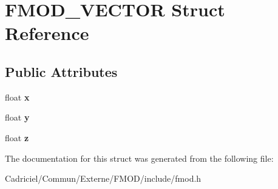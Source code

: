 \hypertarget{struct_f_m_o_d___v_e_c_t_o_r}{\section{F\-M\-O\-D\-\_\-\-V\-E\-C\-T\-O\-R Struct Reference}
\label{struct_f_m_o_d___v_e_c_t_o_r}
}
\subsection*{Public Attributes}
\begin{DoxyCompactItemize}
\item 
\hypertarget{struct_f_m_o_d___v_e_c_t_o_r_afe9fad8ce812c3cfc021c25bbb8bc0e8}{float {\bfseries x}}\label{struct_f_m_o_d___v_e_c_t_o_r_afe9fad8ce812c3cfc021c25bbb8bc0e8}

\item 
\hypertarget{struct_f_m_o_d___v_e_c_t_o_r_abea7feb26ece298baa766f821b8686ff}{float {\bfseries y}}\label{struct_f_m_o_d___v_e_c_t_o_r_abea7feb26ece298baa766f821b8686ff}

\item 
\hypertarget{struct_f_m_o_d___v_e_c_t_o_r_ab64088b1bd2e695bd1abc6b370b71796}{float {\bfseries z}}\label{struct_f_m_o_d___v_e_c_t_o_r_ab64088b1bd2e695bd1abc6b370b71796}

\end{DoxyCompactItemize}


The documentation for this struct was generated from the following file\-:\begin{DoxyCompactItemize}
\item 
Cadriciel/\-Commun/\-Externe/\-F\-M\-O\-D/include/fmod.\-h\end{DoxyCompactItemize}

